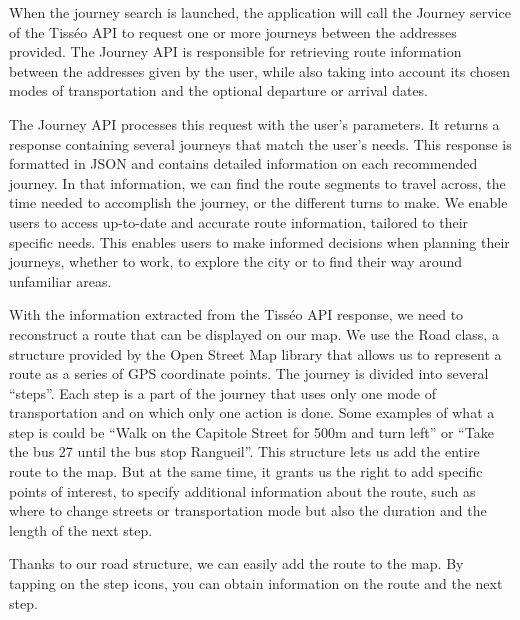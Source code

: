 When the journey search is launched, the application will call the Journey service of the Tisséo API to request one or more journeys between the addresses provided. The Journey API is responsible for retrieving route information between the addresses given by the user, while also taking into account its chosen modes of transportation and the optional departure or arrival dates.


The Journey API processes this request with the user's parameters. It returns a response containing several journeys that match the user's needs. This response is formatted in JSON and contains detailed information on each recommended journey. In that information, we can find the route segments to travel across, the time needed to accomplish the journey, or the different turns to make. We enable users to access up-to-date and accurate route information, tailored to their specific needs. This enables users to make informed decisions when planning their journeys, whether to work, to explore the city or to find their way around unfamiliar areas.


With the information extracted from the Tisséo API response, we need to reconstruct a route that can be displayed on our map. We use the Road class, a structure provided by the Open Street Map library that allows us to represent a route as a series of GPS coordinate points. The journey is divided into several “steps”. Each step is a part of the journey that uses only one mode of transportation and on which only one action is done. Some examples of what a step is could be “Walk on the Capitole Street for 500m and turn left” or “Take the bus 27 until the bus stop Rangueil”. This structure lets us add the entire route to the map. But at the same time, it grants us the right to add specific points of interest, to specify additional information about the route, such as where to change streets or transportation mode but also the duration and the length of the next step.


Thanks to our road structure, we can easily add the route to the map. By tapping on the step icons, you can obtain information on the route and the next step.


